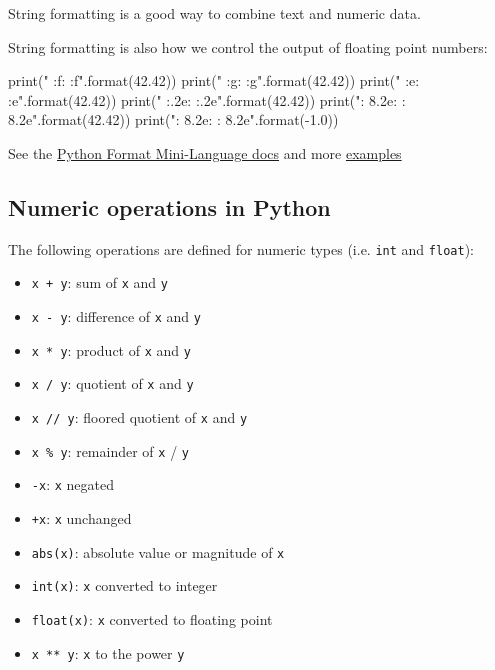 \documentclass[12pt]{article} \newif\ifsolution\solutiontrue %
\begin{document}
String formatting is a good way to combine text and numeric data.

String formatting is also how we control the output of floating point numbers:

\begin{python}
print("    {{:f}}: {:f}".format(42.42))
print("    {{:g}}: {:g}".format(42.42))
print("    {{:e}}: {:e}".format(42.42))
print("  {{:.2e}}: {:.2e}".format(42.42))
print("{{: 8.2e}}: {: 8.2e}".format(42.42))
print("{{: 8.2e}}: {: 8.2e}".format(-1.0))
\end{python}

See the \href{https://docs.python.org/3/library/string.html#format-specification-mini-language}{Python Format Mini-Language docs} and more \href{https://docs.python.org/3/library/string.html#format-examples}{examples}


\subsection{Numeric operations in
Python}\label{numeric-operations-in-python}

The following operations are defined for numeric types (i.e.
\texttt{int} and \texttt{float}):

\begin{itemize}
\item
  \texttt{x\ +\ y}: sum of \texttt{x} and \texttt{y}
\item
  \texttt{x\ -\ y}: difference of \texttt{x} and \texttt{y}
\item
  \texttt{x\ *\ y}: product of \texttt{x} and \texttt{y}
\item
  \texttt{x\ /\ y}: quotient of \texttt{x} and \texttt{y}
\item
  \texttt{x\ //\ y}: floored quotient of \texttt{x} and \texttt{y}
\item
  \texttt{x\ \%\ y}: remainder of \texttt{x} / \texttt{y}
\item
  \texttt{-x}: \texttt{x} negated
\item
  \texttt{+x}: \texttt{x} unchanged
\item
  \texttt{abs(x)}: absolute value or magnitude of \texttt{x}
\item
  \texttt{int(x)}: \texttt{x} converted to integer
\item
  \texttt{float(x)}: \texttt{x} converted to floating point
\item
  \texttt{x\ **\ y}: \texttt{x} to the power \texttt{y}
\end{itemize}
\end{document}
